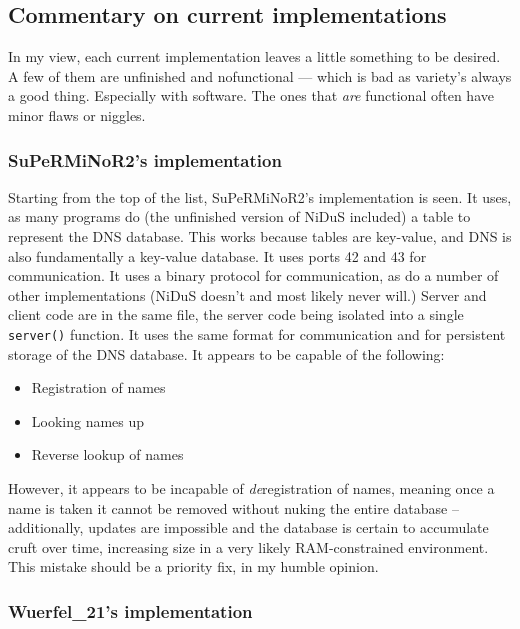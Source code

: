 \documentclass[]{report}
\begin{document}
\subsection{Commentary on current implementations}
In my view, each current implementation leaves a little something to be desired.  A few of them are unfinished and nofunctional --- which is bad as variety's always a good thing. Especially with software. The ones that \emph{are} functional often have minor flaws or niggles. \subsubsection{SuPeRMiNoR2's implementation}
Starting from the top of the list, SuPeRMiNoR2's implementation is seen. It uses, as many programs do (the unfinished version of NiDuS included) a table to represent the DNS database. This works because tables are key-value, and DNS is also fundamentally a key-value database. It uses ports 42 and 43 for communication. It uses a binary protocol for communication, as do a number of other implementations (NiDuS doesn't and most likely never will.) Server and client code are in the same file, the server code being isolated into a single \texttt{server()} function. It uses the same format for communication and for persistent storage of the DNS database. It appears to be capable of the following:
\begin{itemize}
	\item Registration of names
	\item Looking names up
	\item Reverse lookup of names
\end{itemize}
However, it appears to be incapable of \emph{de}registration of names, meaning once a name is taken it cannot be removed without nuking the entire database -- additionally, updates are impossible and the database is certain to accumulate cruft over time, increasing size in a very likely RAM-constrained environment. This mistake should be a priority fix, in my humble opinion.
\subsubsection{Wuerfel\_21's implementation}
\end{document}
